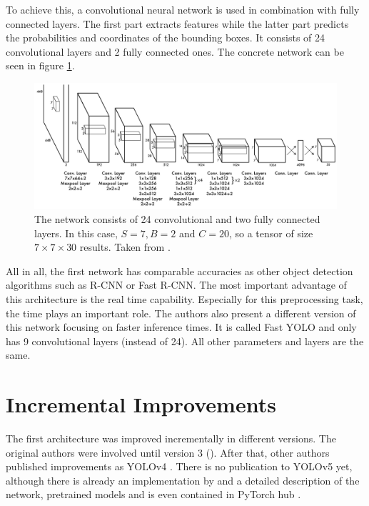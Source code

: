 To achieve this, a convolutional neural network is used in combination with fully connected layers. The first part extracts features while the latter part predicts the probabilities and coordinates of the bounding boxes. It consists of 24 convolutional layers and 2 fully connected ones. The concrete network can be seen in figure \ref{fig:YOLO_network}. \\


\begin{figure}[htb!]
	\centering
	\includegraphics[scale=0.25]{figures/YOLO_network.png}
	\caption{The network consists of 24 convolutional and two fully connected layers. In this case, $ S = 7, B = 2 $ and $ C = 20 $, so a tensor of size $ 7 \times 7 \times 30 $ results. Taken from \cite{yolov1}.}
	\label{fig:YOLO_network}
\end{figure}

All in all, the first network has comparable accuracies as other object detection algorithms such as R-CNN or Fast R-CNN. The most important advantage of this architecture is the real time capability. Especially for this preprocessing task, the time plays an important role. The authors also present a different version of this network focusing on faster inference times. It is called Fast YOLO and only has 9 convolutional layers (instead of 24). All other parameters and layers are the same.

\section{Incremental Improvements}

The first architecture was improved incrementally in different versions. The original authors were involved until version 3 (\cite{yolov1, yolov2, yolov3}). After that, other authors published improvements as YOLOv4 \cite{yolov4}. There is no publication to YOLOv5 yet, although there is already an implementation by \cite{yolov5} and a detailed description of the network, pretrained models and is even contained in PyTorch hub \cite{pytorch_hub_yolov5}. \\

